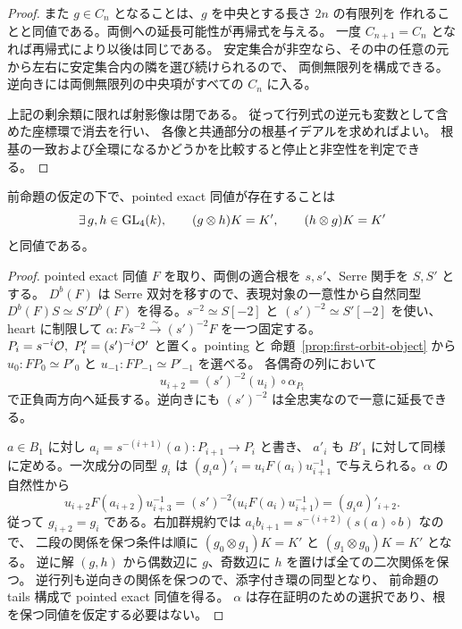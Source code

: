 \begin{proof}
また $g\in C_n$ となることは、$g$ を中央とする長さ $2n$ の有限列を
作れることと同値である。両側への延長可能性が再帰式を与える。
一度 $C_{n+1}=C_n$ となれば再帰式により以後は同じである。
安定集合が非空なら、その中の任意の元から左右に安定集合内の隣を選び続けられるので、
両側無限列を構成できる。逆向きには両側無限列の中央項がすべての $C_n$ に入る。

上記の剰余類に限れば射影像は閉である。
従って行列式の逆元も変数として含めた座標環で消去を行い、
各像と共通部分の根基イデアルを求めればよい。
根基の一致および全環になるかどうかを比較すると停止と非空性を判定できる。
\end{proof}

\begin{corollary}
\label{cor:two-matrix-pointed-equivalence}
前命題の仮定の下で、pointed exact 同値が存在することは
\[
 \exists\,g,h\in\operatorname{GL}_4(k),\qquad
 (g\otimes h)K=K',\qquad(h\otimes g)K=K'
\]
と同値である。
\end{corollary}
\begin{proof}
pointed exact 同値 $F$ を取り、両側の適合根を $s,s'$、Serre 関手を $S,S'$ とする。
$D^b(F)$ は Serre 双対を移すので、表現対象の一意性から自然同型
$D^b(F)S\simeq S'D^b(F)$ を得る。$s^{-2}\simeq S[-2]$ と
$(s')^{-2}\simeq S'[-2]$ を使い、heart に制限して
$\alpha:F s^{-2}\xrightarrow{\sim}(s')^{-2}F$ を一つ固定する。
$P_i=s^{-i}\OO,\ P'_i=(s')^{-i}\OO'$ と置く。pointing と
命題~\ref{prop:first-orbit-object} から $u_0:F P_0\simeq P'_0$ と
$u_{-1}:F P_{-1}\simeq P'_{-1}$ を選べる。
各偶奇の列において
\[
 u_{i+2}=(s')^{-2}(u_i)\circ\alpha_{P_i}
\]
で正負両方向へ延長する。逆向きにも $(s')^{-2}$ は全忠実なので一意に延長できる。

$a\in B_1$ に対し $a_i=s^{-(i+1)}(a):P_{i+1}\to P_i$ と書き、
$a'_i$ も $B'_1$ に対して同様に定める。一次成分の同型 $g_i$ は
$(g_i a)'_i=u_iF(a_i)u_{i+1}^{-1}$ で与えられる。$\alpha$ の自然性から
\[
 u_{i+2}F(a_{i+2})u_{i+3}^{-1}
   =(s')^{-2}\bigl(u_iF(a_i)u_{i+1}^{-1}\bigr)
   =(g_i a)'_{i+2}.
\]
従って $g_{i+2}=g_i$ である。右加群規約では
$a_i b_{i+1}=s^{-(i+2)}(s(a)\circ b)$ なので、
二段の関係を保つ条件は順に $(g_0\otimes g_1)K=K'$ と
$(g_1\otimes g_0)K=K'$ となる。
逆に解 $(g,h)$ から偶数辺に $g$、奇数辺に $h$ を置けば全ての二次関係を保つ。
逆行列も逆向きの関係を保つので、添字付き環の同型となり、
前命題の tails 構成で pointed exact 同値を得る。
$\alpha$ は存在証明のための選択であり、根を保つ同値を仮定する必要はない。
\end{proof}

